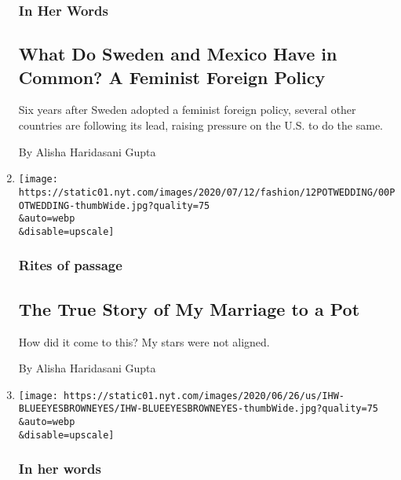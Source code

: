 \begin{enumerate}
  \hypertarget{in-her-words-1}{%
  \subsubsection{In Her Words}\label{in-her-words-1}}

  \hypertarget{what-do-sweden-and-mexico-have-in-common-a-feminist-foreign-policy}{%
  \subsection{What Do Sweden and Mexico Have in Common? A Feminist
  Foreign
  Policy}\label{what-do-sweden-and-mexico-have-in-common-a-feminist-foreign-policy}}

  Six years after Sweden adopted a feminist foreign policy, several
  other countries are following its lead, raising pressure on the U.S.
  to do the same.

  By Alisha Haridasani Gupta
\item
  \href{/2020/07/09/style/manglik-pot-marriage.html}{}

  \texttt{[image: https://static01.nyt.com/images/2020/07/12/fashion/12POTWEDDING/00POTWEDDING-thumbWide.jpg?quality=75\\\&auto=webp\\\&disable=upscale]}

  \hypertarget{rites-of-passage}{%
  \subsubsection{Rites of passage}\label{rites-of-passage}}

  \hypertarget{the-true-story-of-my-marriage-to-a-pot}{%
  \subsection{The True Story of My Marriage to a
  Pot}\label{the-true-story-of-my-marriage-to-a-pot}}

  How did it come to this? My stars were not aligned.

  By Alisha Haridasani Gupta
\item
  \href{/2020/07/04/us/jane-elliott-anti-racism-blue-eyes-brown-eyes.html}{}

  \texttt{[image: https://static01.nyt.com/images/2020/06/26/us/IHW-BLUEEYESBROWNEYES/IHW-BLUEEYESBROWNEYES-thumbWide.jpg?quality=75\\\&auto=webp\\\&disable=upscale]}

  \hypertarget{in-her-words-2}{%
  \subsubsection{In her words}\label{in-her-words-2}}


\end{enumerate}
